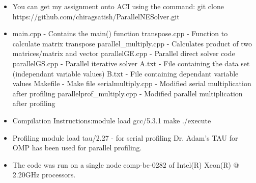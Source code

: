 \documentclass{article}
\begin{document}
\begin{spacing}{1.1}
\begin{appendices}
\begin{itemize}
    \item You can get my assignment onto ACI using the command: \newline git clone https://github.com/chiragsatish/ParallelNESolver.git
    \item main.cpp - Contains the main() function \newline transpose.cpp - Function to calculate matrix transpose \newline parallel\_multiply.cpp - Calculates product of two matrices/matrix and vector \newline parallelGE.cpp - Parallel direct solver code \newline parallelGS.cpp - Parallel iterative solver \newline A.txt - File containing the data set (independant variable values) \newline B.txt - File containing dependant variable values \newline Makefile - Make file \newline serialmultiply.cpp - Modified serial multiplication after profiling \newline parallelprof\_multiply.cpp - Modified parallel multiplication after profiling 
    \item Compilation Instructions:\newline module load gcc/5.3.1 \newline make \newline ./execute
    \item Profiling \newline module load tau/2.27 - for serial profiling \newline Dr. Adam's TAU for OMP has been used for parallel profiling.
    \item The code was run on a single node comp-bc-0282 of Intel(R) Xeon(R)  @ 2.20GHz processors.
\end{itemize}


\end{appendices}





\end{spacing}
\end{document}
